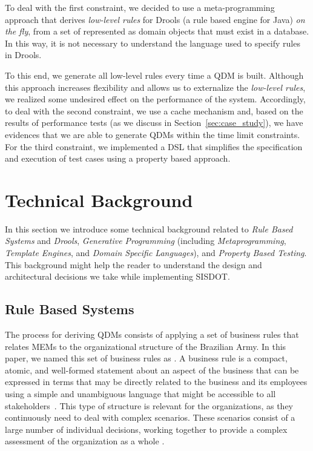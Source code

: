 To deal with the first constraint, we decided to use a meta-programming approach that derives \emph{low-level rules} for Drools (a rule based engine for Java) \emph{on the fly}, from a set of \callers represented as domain objects that must exist in a database. In this way, it is not necessary to understand the language used to specify rules in Drools.

To this end, we generate all low-level rules every time a QDM is built.
Although this approach increases flexibility and allows us to externalize the \emph{low-level rules}, we realized some undesired effect on the performance of the system. Accordingly, to deal with the second constraint, we use a cache mechanism and, based on the results of performance tests (as we discuss in Section~\ref{sec:case_study}), we have evidences that we are able to generate QDMs within the time
limit constraints. For the third constraint, we implemented a DSL that simplifies the specification and execution of test cases using a property based approach. 


\section{Technical Background}


In this section we
introduce some technical background related to \emph{Rule Based Systems} and
\emph{Drools}, \emph{Generative Programming} (including \emph{Metaprogramming},
\emph{Template Engines}, and \emph{Domain Specific Languages}), and
\emph{Property Based Testing}. This background might help the reader to
understand the design and architectural decisions we take
while implementing SISDOT.  
\subsection{Rule Based Systems}
\label{sec:rbs}
The process for deriving QDMs consists of applying a set of business rules that relates MEMs to the organizational structure of the Brazilian Army. In this paper, we named this set of business rules as \callers. A business rule is a compact, atomic, and well-formed statement about an aspect of the business that can be expressed in terms that may be directly related to the business and its employees using a simple and unambiguous language that might be accessible to all stakeholders~\cite{graham2007business}. This type of structure is relevant for the organizations, as they continuously need to deal with complex scenarios. These scenarios consist of a large number of individual decisions, working together to provide a complex assessment of the organization as a whole \cite{salatino2016mastering}.

